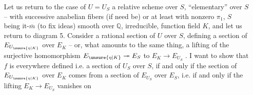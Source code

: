 Let us return to the case of $U=U_S$ a relative scheme over $S$, ``elementary'' over $S$ -- with successive anabelian fibers (if need be) or at least with nonzero $\pi_1$, $S$ being it-$\overline m$ (to fix ideas) smooth over $\mathbb{Q}$, irreducible, function field $K$, and let us return to diagram 5. Consider a rational section  of $U$ over $S$, defining a section of $E_{U_{\unsure{\eta|K}}}$ over $E_K$ -- or, what amounts to the same thing, a lifting of the surjective homomorphism $E_{\unsure{\eta|K}}\twoheadrightarrow E_S$ to $E_K\longrightarrow E_{U_S}$ . I want to show that $f$ is everywhere defined i.e. a section  of $U_S$ over $S$, if and only if the section of $E_{U_{\unsure{\eta|K}}}$ over $E_K$ comes from a section of $E_{U_S}$ over $E_S$, i.e. if and only if the lifting $E_K\longrightarrow E_{U_S}$ vanishes on
